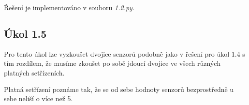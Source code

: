 \documentclass[a4paper, 12pt]{article}
\begin{document}
  Řešení je implementováno v souboru \textit{1.2.py}.

  \subsection*{Úkol 1.5}
  Pro tento úkol lze vyzkoušet dvojice senzorů podobně jako v řešení pro úkol 1.4 s tím rozdílem, že musíme zkoušet po sobě jdoucí dvojice ve všech různých platných setřízeních.

  Platná setřízení poznáme tak, že se od sebe hodnoty senzorů bezprostředně u sebe neliší o více než 5.
\end{document}
